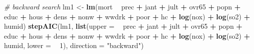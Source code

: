 \documentclass[
]{book}
\newenvironment{Shaded}{\begin{snugshade}}{\end{snugshade}}
\newcommand{\CommentTok}[1]{\textcolor[rgb]{0.56,0.35,0.01}{\textit{#1}}}
\newcommand{\DataTypeTok}[1]{\textcolor[rgb]{0.13,0.29,0.53}{#1}}
\newcommand{\DecValTok}[1]{\textcolor[rgb]{0.00,0.00,0.81}{#1}}
\newcommand{\KeywordTok}[1]{\textcolor[rgb]{0.13,0.29,0.53}{\textbf{#1}}}
\newcommand{\NormalTok}[1]{#1}
\newcommand{\OperatorTok}[1]{\textcolor[rgb]{0.81,0.36,0.00}{\textbf{#1}}}
\newcommand{\StringTok}[1]{\textcolor[rgb]{0.31,0.60,0.02}{#1}}
\begin{document}
\begin{Shaded}
\begin{Highlighting}[]
\CommentTok{# backward search}
\NormalTok{lm1 <-}\StringTok{ }\KeywordTok{lm}\NormalTok{(mort }\OperatorTok{~}\StringTok{ }\NormalTok{prec }\OperatorTok{+}\StringTok{ }\NormalTok{jant }\OperatorTok{+}\StringTok{ }\NormalTok{jult }\OperatorTok{+}\StringTok{ }\NormalTok{ovr65 }\OperatorTok{+}\StringTok{ }\NormalTok{popn }\OperatorTok{+}\StringTok{ }\NormalTok{educ }\OperatorTok{+}\StringTok{ }\NormalTok{hous }\OperatorTok{+}\StringTok{ }\NormalTok{dens }\OperatorTok{+}\StringTok{ }\NormalTok{nonw }\OperatorTok{+}
\NormalTok{		 wwdrk }\OperatorTok{+}\StringTok{ }\NormalTok{poor }\OperatorTok{+}\StringTok{ }\NormalTok{hc }\OperatorTok{+}\StringTok{ }\KeywordTok{log}\NormalTok{(nox) }\OperatorTok{+}\StringTok{ }\KeywordTok{log}\NormalTok{(so2) }\OperatorTok{+}\StringTok{ }\NormalTok{humid)}
\KeywordTok{stepAIC}\NormalTok{(lm1, }\KeywordTok{list}\NormalTok{(}\DataTypeTok{upper =} \OperatorTok{~}\StringTok{ }\NormalTok{prec }\OperatorTok{+}\StringTok{ }\NormalTok{jant }\OperatorTok{+}\StringTok{ }\NormalTok{jult }\OperatorTok{+}\StringTok{ }\NormalTok{ovr65 }\OperatorTok{+}\StringTok{ }\NormalTok{popn }\OperatorTok{+}\StringTok{ }\NormalTok{educ }\OperatorTok{+}\StringTok{ }\NormalTok{hous }\OperatorTok{+}\StringTok{ }\NormalTok{dens }\OperatorTok{+}\StringTok{ }\NormalTok{nonw }\OperatorTok{+}\StringTok{ }\NormalTok{wwdrk }\OperatorTok{+}\StringTok{ }\NormalTok{poor }\OperatorTok{+}\StringTok{ }\NormalTok{hc }\OperatorTok{+}\StringTok{ }\KeywordTok{log}\NormalTok{(nox) }\OperatorTok{+}\StringTok{ }\KeywordTok{log}\NormalTok{(so2) }\OperatorTok{+}\StringTok{ }\NormalTok{humid, }\DataTypeTok{lower =} \OperatorTok{~}\StringTok{ }\DecValTok{1}\NormalTok{), }\DataTypeTok{direction =} \StringTok{"backward"}\NormalTok{)}
\end{Highlighting}
\end{Shaded}
\end{document}
